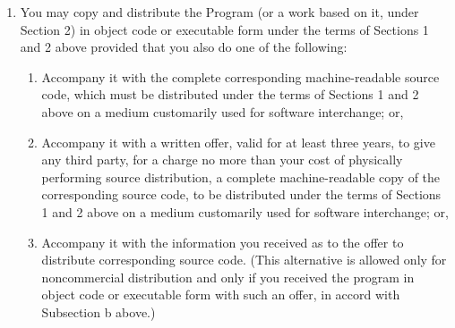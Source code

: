 \documentclass{book}
\begin{document}
{\begin{enumerate}
These requirements apply to the modified work as a whole.  If
identifiable sections of that work are not derived from the Program,
and can be reasonably considered independent and separate works in
themselves, then this License, and its terms, do not apply to those
sections when you distribute them as separate works.  But when you
distribute the same sections as part of a whole which is a work based
on the Program, the distribution of the whole must be on the terms of
this License, whose permissions for other licensees extend to the
entire whole, and thus to each and every part regardless of who wrote it.

Thus, it is not the intent of this section to claim rights or contest
your rights to work written entirely by you; rather, the intent is to
exercise the right to control the distribution of derivative or
collective works based on the Program.

In addition, mere aggregation of another work not based on the Program
with the Program (or with a work based on the Program) on a volume of
a storage or distribution medium does not bring the other work under
the scope of this License.

\item
You may copy and distribute the Program (or a work based on it,
under Section 2) in object code or executable form under the terms of
Sections 1 and 2 above provided that you also do one of the following:

\begin{enumerate}

\item

Accompany it with the complete corresponding machine-readable
source code, which must be distributed under the terms of Sections
1 and 2 above on a medium customarily used for software interchange; or,

\item

Accompany it with a written offer, valid for at least three
years, to give any third party, for a charge no more than your
cost of physically performing source distribution, a complete
machine-readable copy of the corresponding source code, to be
distributed under the terms of Sections 1 and 2 above on a medium
customarily used for software interchange; or,

\item

Accompany it with the information you received as to the offer
to distribute corresponding source code.  (This alternative is
allowed only for noncommercial distribution and only if you
received the program in object code or executable form with such
an offer, in accord with Subsection b above.)


\end{enumerate}
\end{enumerate}}
\end{document}
